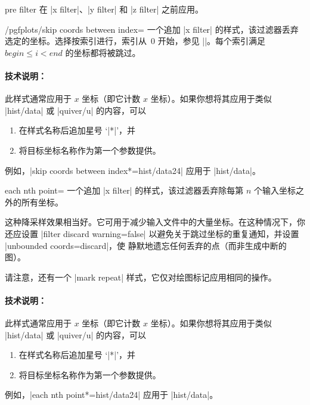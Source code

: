 \begin{pgfplotscodekey}{pre filter}
    在 |x filter|、|y filter| 和 |z filter| 之前应用。
\end{pgfplotscodekey}

\begin{stylekey}{/pgfplots/skip coords between index=}
    一个追加 |x filter| 的样式，该过滤器丢弃选定的坐标。选择按索引进行，索引从~$0$ 开始，参见 |\coordindex|。每个索引满足 $\mathit{begin} \le i < \mathit{end}$ 的坐标都将被跳过。
\begin{codeexample}[]
\end{codeexample}

    \paragraph{技术说明：}

    此样式通常应用于 $x$ 坐标（即它计数 $x$ 坐标）。如果你想将其应用于类似 |hist/data| 或 |quiver/u| 的内容，可以
    \begin{enumerate}
        \item 在样式名称后追加星号 `|*|'，并
        \item 将目标坐标名称作为第一个参数提供。
    \end{enumerate}
    例如，|skip coords between index*={hist/data}{2}{4}| 应用于 |hist/data|。
\end{stylekey}

\begin{pgfplotskey}{each nth point=}
    一个追加 |x filter| 的样式，该过滤器丢弃除每第 $n$ 个输入坐标之外的所有坐标。

    这种降采样效果相当好。它可用于减少输入文件中的大量坐标。在这种情况下，你还应设置 |filter discard warning=false| 以避免关于跳过坐标的重复通知，并设置 |unbounded coords=discard|，使 \PGFPlots{} 静默地遗忘任何丢弃的点（而非生成中断的图）。

    请注意，还有一个 |mark repeat| 样式，它仅对绘图标记应用相同的操作。


    \paragraph{技术说明：}

    此样式通常应用于 $x$ 坐标（即它计数 $x$ 坐标）。如果你想将其应用于类似 |hist/data| 或 |quiver/u| 的内容，可以
    \begin{enumerate}
        \item 在样式名称后追加星号 `|*|'，并
        \item 将目标坐标名称作为第一个参数提供。
    \end{enumerate}
    例如，|each nth point*={hist/data}{2}{4}| 应用于 |hist/data|。
\end{pgfplotskey}

